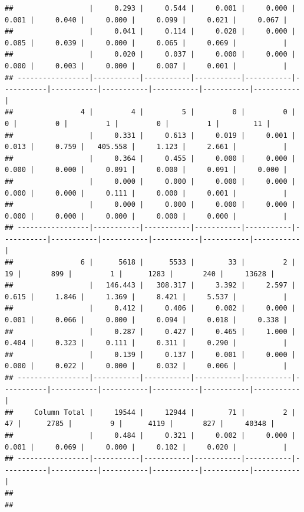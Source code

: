 \documentclass[]{article}
\begin{document}
\begin{verbatim}
##                  |     0.293 |     0.544 |     0.001 |     0.000 |     0.001 |     0.040 |     0.000 |     0.099 |     0.021 |     0.067 | 
##                  |     0.041 |     0.114 |     0.028 |     0.000 |     0.085 |     0.039 |     0.000 |     0.065 |     0.069 |           | 
##                  |     0.020 |     0.037 |     0.000 |     0.000 |     0.000 |     0.003 |     0.000 |     0.007 |     0.001 |           | 
## -----------------|-----------|-----------|-----------|-----------|-----------|-----------|-----------|-----------|-----------|-----------|
##                4 |         4 |         5 |         0 |         0 |         0 |         0 |         1 |         0 |         1 |        11 | 
##                  |     0.331 |     0.613 |     0.019 |     0.001 |     0.013 |     0.759 |   405.558 |     1.123 |     2.661 |           | 
##                  |     0.364 |     0.455 |     0.000 |     0.000 |     0.000 |     0.000 |     0.091 |     0.000 |     0.091 |     0.000 | 
##                  |     0.000 |     0.000 |     0.000 |     0.000 |     0.000 |     0.000 |     0.111 |     0.000 |     0.001 |           | 
##                  |     0.000 |     0.000 |     0.000 |     0.000 |     0.000 |     0.000 |     0.000 |     0.000 |     0.000 |           | 
## -----------------|-----------|-----------|-----------|-----------|-----------|-----------|-----------|-----------|-----------|-----------|
##                6 |      5618 |      5533 |        33 |         2 |        19 |       899 |         1 |      1283 |       240 |     13628 | 
##                  |   146.443 |   308.317 |     3.392 |     2.597 |     0.615 |     1.846 |     1.369 |     8.421 |     5.537 |           | 
##                  |     0.412 |     0.406 |     0.002 |     0.000 |     0.001 |     0.066 |     0.000 |     0.094 |     0.018 |     0.338 | 
##                  |     0.287 |     0.427 |     0.465 |     1.000 |     0.404 |     0.323 |     0.111 |     0.311 |     0.290 |           | 
##                  |     0.139 |     0.137 |     0.001 |     0.000 |     0.000 |     0.022 |     0.000 |     0.032 |     0.006 |           | 
## -----------------|-----------|-----------|-----------|-----------|-----------|-----------|-----------|-----------|-----------|-----------|
##     Column Total |     19544 |     12944 |        71 |         2 |        47 |      2785 |         9 |      4119 |       827 |     40348 | 
##                  |     0.484 |     0.321 |     0.002 |     0.000 |     0.001 |     0.069 |     0.000 |     0.102 |     0.020 |           | 
## -----------------|-----------|-----------|-----------|-----------|-----------|-----------|-----------|-----------|-----------|-----------|
## 
## 
\end{verbatim}
\end{document}
